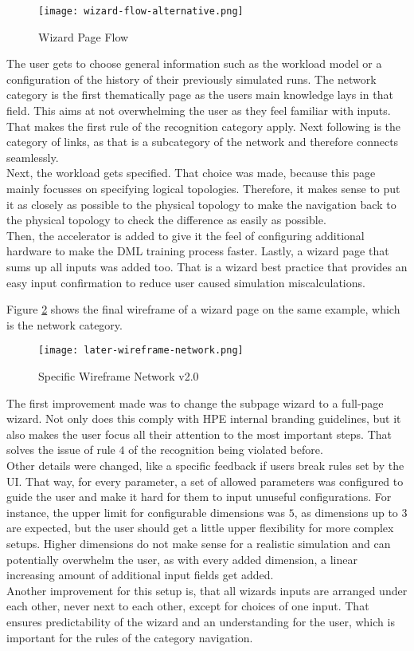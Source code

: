\begin{figure}[h]
    \centering
    \texttt{[image: wizard-flow-alternative.png]}
    \caption{Wizard Page Flow}
    \label{fig:wizard-flow}
\end{figure}

The user gets to choose general information such as the workload model or a configuration of the history of their previously simulated runs.
The network category is the first thematically page as the users main knowledge lays in that field. This aims at not overwhelming the user as they feel familiar with inputs. That makes the first rule of the recognition category apply.
Next following is the category of links, as that is a subcategory of the network and therefore connects seamlessly. \\
Next, the workload gets specified. That choice was made, because this page mainly focusses on specifying logical topologies. Therefore, it makes sense to put it as closely as possible to the physical topology to make the navigation back to the physical topology to check the difference as easily as possible. \\
Then, the accelerator is added to give it the feel of configuring additional hardware to make the \ac{DML} training process faster. 
Lastly, a wizard page that sums up all inputs was added too. That is a wizard best practice that provides an easy input confirmation to reduce user caused simulation miscalculations. 

Figure \ref{fig:wire-3} shows the final wireframe of a wizard page on the same example, which is the network category. 

\begin{figure}[h]
    \centering
    \texttt{[image: later-wireframe-network.png]}
    \caption{Specific Wireframe Network v2.0}
    \label{fig:wire-3}
\end{figure}

The first improvement made was to change the subpage wizard to a full-page wizard. Not only does this comply with \ac{HPE} internal branding guidelines, but it also makes the user focus all their attention to the most important steps. That solves the issue of rule $4$ of the recognition being violated before. \\
Other details were changed, like a specific feedback if users break rules set by the \ac{UI}. That way, for every parameter, a set of allowed parameters was configured to guide the user and make it hard for them to input unuseful configurations.
For instance, the upper limit for configurable dimensions was $5$, as dimensions up to $3$ are expected, but the user should get a little upper flexibility for more complex setups. Higher dimensions do not make sense for a realistic simulation and can potentially overwhelm the user, as with every added dimension, a linear increasing amount of additional input fields get added. \\
Another improvement for this setup is, that all wizards inputs are arranged under each other, never next to each other, except for choices of one input. That ensures predictability of the wizard and an understanding for the user, which is important for the rules of the category navigation.


